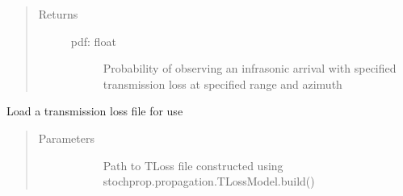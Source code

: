\documentclass[letterpaper,10pt,english]{sphinxmanual}
\begin{document}
\begin{fulllineitems}
\begin{fulllineitems}
\begin{quote}
\begin{description}
\begin{description}
\end{description}

\item[{Returns}] \leavevmode\begin{description}
\item[{pdf: float}] \leavevmode
Probability of observing an infrasonic arrival with specified transmission loss at specified range and azimuth

\end{description}

\end{description}\end{quote}

\end{fulllineitems}


\begin{fulllineitems}
\label{\detokenize{stochprop.propagation:stochprop.propagation.TLossModel.load}}
Load a transmission loss file for use
\begin{quote}\begin{description}
\item[{Parameters}] \leavevmode\begin{description}
\item[{}] \leavevmode
Path to TLoss file constructed using stochprop.propagation.TLossModel.build()

\end{description}

\end{description}\end{quote}

\end{fulllineitems}


\end{fulllineitems}

\end{document}
